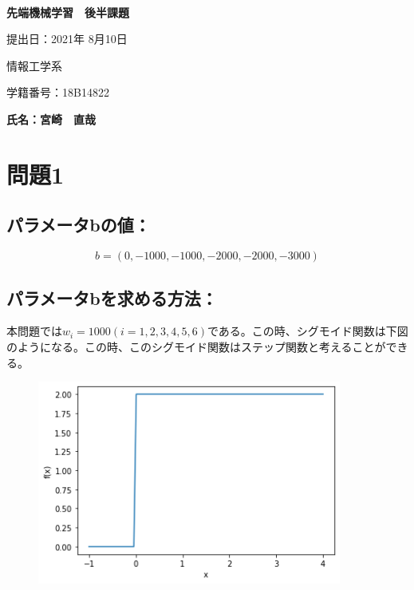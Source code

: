 \documentclass[a4j,11pt]{jarticle}
\begin{document}
\begin{center}
　\vspace{10mm}

{\bf {\huge 先端機械学習　後半課題}}

\vspace{80mm}

提出日：2021年 8月10日

\vspace{10mm}

情報工学系

\vspace{10mm}

学籍番号：18B14822

\vspace{10mm}


\vspace{20mm}

{\bf {\LARGE 氏名：宮崎　直哉}}
\end{center}





\newpage




\section{問題1}

\subsection*{パラメータbの値：}

\begin{equation*}
    b = (0, -1000, -1000, -2000, -2000, -3000)
\end{equation*}

\subsection*{パラメータbを求める方法：}
本問題では$w_i = 1000 (i = 1,2,3,4,5,6)$である。この時、シグモイド関数は下図のようになる。この時、このシグモイド関数はステップ関数と考えることができる。

\begin{figure}[hbtp]
    \centering
    \includegraphics[width=10cm]{p1-3.png}
\end{figure}
\end{document}
